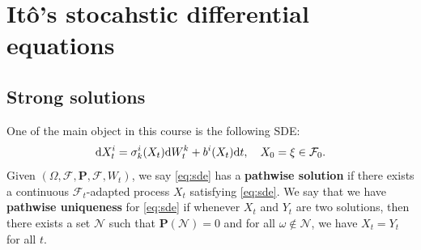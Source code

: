 \documentclass[twoside, 12pt]{book}
\numberwithin{equation}{chapter}
\def\cF{{\mathcal F}}
\def\cN{{\mathcal N}}
\def\bP{{\mathbf P}}
\def\sF{{\mathscr F}}
\def\d{\text{\rm{d}}}
\begin{document}
	
	\chapter{It\^o's stocahstic differential equations}\label{chapt:sde}
	
	\section{Strong solutions}
	One of the main object in this course is the following SDE:
	\begin{equation}\label{eq:sde}
		\d X_t^i = \sigma^{i}_{k}(X_t) \d W_t^k+b^i(X_t) \d t, \quad X_0=\xi \in \cF_0. 
	\end{equation}
	Given $(\Omega, \cF, \bP, \sF,W_t)$, we say \eqref{eq:sde} has a {\bf pathwise solution} if there exists a continuous $\cF_t$-adapted process $X_t$ satisfying \eqref{eq:sde}. We say that we have {\bf pathwise uniqueness} for \eqref{eq:sde} if whenever $X_t$ and $Y_t$ are two solutions, then there exists a set $\cN$ such that $\bP(\cN)=0$ and for all $\omega\notin \cN$, we have $X_t=Y_t$ for all $t$.
	
\end{document}
